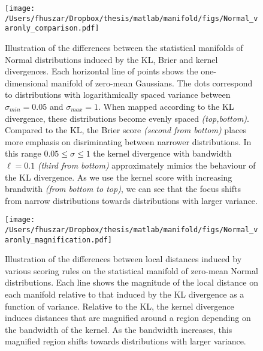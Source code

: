 \begin{figure} %
	\begin{center}
		\texttt{[image: /Users/fhuszar/Dropbox/thesis/matlab/manifold/figs/Normal\_varonly\_comparison.pdf]}
	\end{center}
	\caption[Brier, kernel and logarithmic scoring of Normal distributions]{Illustration of the differences between the statistical manifolds of Normal distributions induced by the KL, Brier and kernel divergences. Each horizontal line of points shows the one-dimensional manifold of zero-mean Gaussians. The dots correspond to distributions with logarithmically spaced variance between $\sigma_{min}=0.05$ and $\sigma_{max}=1$. When mapped according to the KL divergence, these distributions become evenly spaced \emph{(top,bottom)}. Compared to the KL, the Brier score \emph{(second from bottom)} places more emphasis on disriminating between narrower distributions. In this range $0.05 \leq \sigma \leq 1$ the kernel divergence with bandwidth $\ell=0.1$ \emph{(third from bottom)} approximately mimics the behaviour of the KL divergence. As we use the kernel score with increasing brandwith \emph{(from bottom to top)}, we can see that the focus shifts from narrow distributions towards distributions with larger variance.}
	\label{fig:Normal_varonly_comparison}
\end{figure}

\begin{figure} %
	\begin{center}
	  \texttt{[image: /Users/fhuszar/Dropbox/thesis/matlab/manifold/figs/Normal\_varonly\_magnification.pdf]}
	\end{center}
	\caption[Local distances on the statistical manifold of Normal distributions]{Illustration of the differences between local distances induced by various scoring rules on the statistical manifold of zero-mean Normal distributions. Each line shows the magnitude of the local distance on each manifold relative to that induced by the KL divergence as a function of variance. Relative to the KL, the kernel divergence induces distances that are magnified around a region depending on the bandwidth of the kernel. As the bandwidth increases, this magnified region shifts towards distributions with larger variance.}
	\label{fig:Normal_varonly_magnification}
\end{figure}

